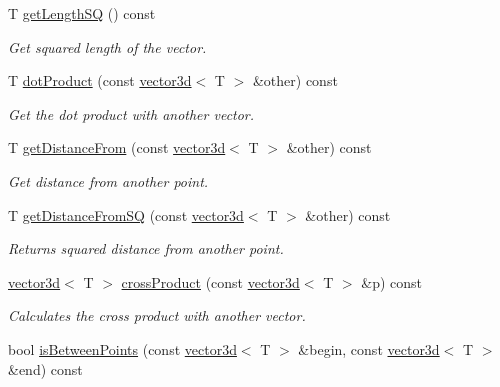 \begin{DoxyCompactItemize}
T \hyperlink{classirr_1_1core_1_1vector3d_a480a5d34b0ebaa39b5da403249746cf0}{get\+Length\+SQ} () const
\begin{DoxyCompactList}\small\item\em Get squared length of the vector. \end{DoxyCompactList}\item 
\mbox{\label{classirr_1_1core_1_1vector3d_ae220d3f24173601c5957961382588394}} 
T \hyperlink{classirr_1_1core_1_1vector3d_ae220d3f24173601c5957961382588394}{dot\+Product} (const \hyperlink{classirr_1_1core_1_1vector3d}{vector3d}$<$ T $>$ \&other) const
\begin{DoxyCompactList}\small\item\em Get the dot product with another vector. \end{DoxyCompactList}\item 
T \hyperlink{classirr_1_1core_1_1vector3d_ab838ab8784f4e53453eb45223f624760}{get\+Distance\+From} (const \hyperlink{classirr_1_1core_1_1vector3d}{vector3d}$<$ T $>$ \&other) const
\begin{DoxyCompactList}\small\item\em Get distance from another point. \end{DoxyCompactList}\item 
T \hyperlink{classirr_1_1core_1_1vector3d_a01ba1b5d0cbf1b47245304e62c7fb5a1}{get\+Distance\+From\+SQ} (const \hyperlink{classirr_1_1core_1_1vector3d}{vector3d}$<$ T $>$ \&other) const
\begin{DoxyCompactList}\small\item\em Returns squared distance from another point. \end{DoxyCompactList}\item 
\hyperlink{classirr_1_1core_1_1vector3d}{vector3d}$<$ T $>$ \hyperlink{classirr_1_1core_1_1vector3d_a868da2be92d9b5c05858a17bc580ddd6}{cross\+Product} (const \hyperlink{classirr_1_1core_1_1vector3d}{vector3d}$<$ T $>$ \&p) const
\begin{DoxyCompactList}\small\item\em Calculates the cross product with another vector. \end{DoxyCompactList}\item 
bool \hyperlink{classirr_1_1core_1_1vector3d_abbde78a7c345e22a6fd42f4c84e9038c}{is\+Between\+Points} (const \hyperlink{classirr_1_1core_1_1vector3d}{vector3d}$<$ T $>$ \&begin, const \hyperlink{classirr_1_1core_1_1vector3d}{vector3d}$<$ T $>$ \&end) const

\end{DoxyCompactItemize}
